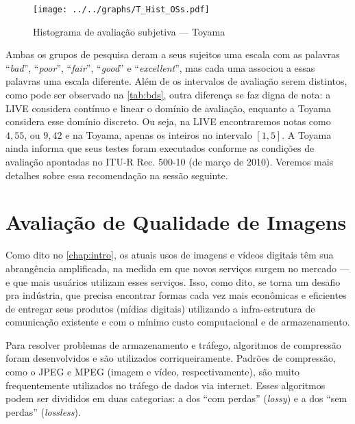 \begin{figure}[htb]
	\centering
	\begin{minipage}{.8\textwidth}
		\caption{Histograma de avaliação subjetiva --- Toyama}\label{graf:toyaHist}
		\centerline{\texttt{[image: ../../graphs/T\_Hist\_OSs.pdf]}}
	\end{minipage}
\end{figure}

Ambas os grupos de pesquisa deram a seus sujeitos uma escala com as palavras ``\emph{bad}'', ``\emph{poor}'', ``\emph{fair}'', ``\emph{good}'' e ``\emph{excellent}'', mas cada uma associou a essas palavras uma escala diferente. Além de os intervalos de avaliação serem distintos, como pode ser observado na \autoref{tab:bds}, outra diferença se faz digna de nota: a LIVE considera contínuo e linear o domínio de avaliação, enquanto a Toyama considera esse domínio discreto. Ou seja, na LIVE encontraremos notas como $4,55$, ou $9,42$ e na Toyama, apenas os inteiros no intervalo $[1,5]$. A Toyama ainda informa que seus testes foram executados conforme as condições de avaliação apontadas no ITU-R Rec. 500-10 (de março de 2010). Veremos mais detalhes sobre essa recomendação na sessão seguinte.

\section{Avaliação de Qualidade de Imagens}

Como dito no \autoref{chap:intro}, os atuais usos de imagens e vídeos digitais têm sua abrangência amplificada, na medida em que novos serviços surgem no mercado --- e que mais usuários utilizam esses serviços. Isso, como dito, se torna um desafio pra indústria, que precisa encontrar formas cada vez mais econômicas e eficientes de entregar seus produtos (mídias digitais) utilizando a infra-estrutura de comunicação existente e com o mínimo custo computacional e de armazenamento.

Para resolver problemas de armazenamento e tráfego, algoritmos de compressão foram desenvolvidos e são utilizados corriqueiramente. Padrões de compressão, como o JPEG e MPEG (imagem e vídeo, respectivamente), são muito frequentemente utilizados no tráfego de dados via internet. Esses algoritmos podem ser divididos em duas categorias: a dos ``com perdas'' (\emph{lossy}) e a dos ``sem perdas'' (\emph{lossless}).


